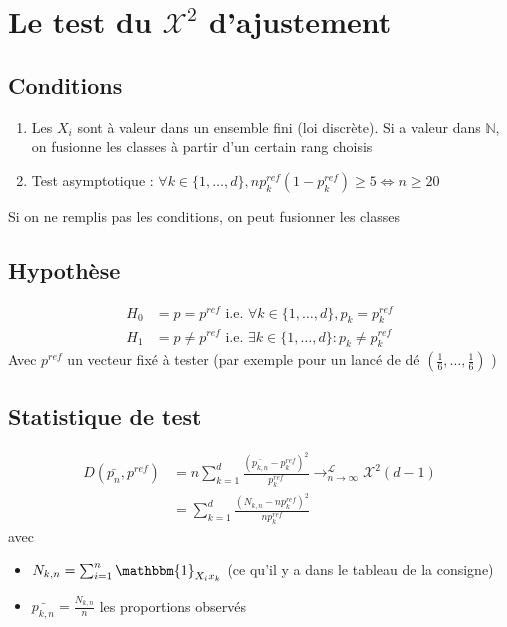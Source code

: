 \documentclass{article}
\theoremstyle{plain}%
\theoremstyle{definition}
\theoremstyle{remark}
\begin{document}
\section{Le test du $ \mathcal{X}^2 $ d'ajustement}
\subsection*{Conditions}
\begin{enumerate}
    \item Les $ X_i $ sont à valeur dans un ensemble fini (loi discrète). Si a valeur dans $ \mathbb{N} $, on fusionne les classes à partir d'un certain rang choisis 
    \item Test asymptotique : $ \forall k \in \{1, \dots, d\}, np_k^{ref}(1-p_k^{ref}) \geq 5 \Leftrightarrow n \geq 20$ 
\end{enumerate}
Si on ne remplis pas les conditions, on peut fusionner les classes 

\subsection*{Hypothèse}
\begin{align*}
    H_0 &= p = p^{ref} \text{ i.e. } \forall k \in \{1,\dots,d\}, p_k = p_k^{ref} \\
    H_1 &= p \neq p^{ref} \text{ i.e. } \exists k \in \{1, \dots, d\}: p_k \neq p_k^{ref}
\end{align*}
Avec $ p^{ref} $ un vecteur fixé à tester (par exemple pour un lancé de dé $ (\frac{1}{6}, \dots, \frac{1}{6}) $ )

\subsection*{Statistique de test}
\begin{align*}
    D(\bar{p_n}, p^{ref}) &= n \sum_{k=1}^{d}\frac{(\bar{p_{k,n}} - p_k^{ref})^2}{p_k^{ref}} \to ^{\mathcal{L}}_{n \to \infty } \mathcal{X}^2(d-1) \\
        &= \sum_{k=1}^{d} \frac{(N_{k,n} - np_k^{ref})^2}{n p_k^{ref}}
\end{align*}
avec \begin{itemize}
    \item $ N_{k,n} = \sum_{i=1}^{n}\mathbbm{1}_{X_i x_k} $ (ce qu'il y a dans le tableau de la consigne)
    \item $ \bar{p_{k,n}} = \frac{N_{k,n}}{n} $ les proportions observés
\end{itemize}
\end{document}
